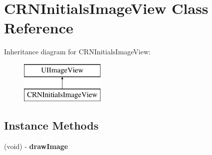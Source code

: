 \hypertarget{interface_c_r_n_initials_image_view}{}\section{C\+R\+N\+Initials\+Image\+View Class Reference}
\label{interface_c_r_n_initials_image_view}
Inheritance diagram for C\+R\+N\+Initials\+Image\+View\+:\begin{figure}[H]
\begin{center}
\leavevmode
\includegraphics[height=2.000000cm]{interface_c_r_n_initials_image_view}
\end{center}
\end{figure}
\subsection*{Instance Methods}
\begin{DoxyCompactItemize}
\item 
\hypertarget{interface_c_r_n_initials_image_view_adcd5e6bed6e8eb8fc043d9f606affbf3}{}(void) -\/ {\bfseries draw\+Image}\label{interface_c_r_n_initials_image_view_adcd5e6bed6e8eb8fc043d9f606affbf3}

\end{DoxyCompactItemize}
